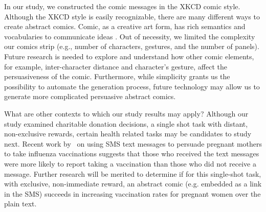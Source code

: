 \begin{description}[leftmargin=\parindent,topsep=0pt,partopsep=3pt,parsep=0pt,itemsep=3pt, listparindent=\parindent]
  \item[Comic Message Construction:] In our study, we constructed the comic messages in the XKCD comic style. Although the XKCD style is easily recognizable, there are many different ways to create abstract comics.  Comic, as a creative art form, has rich semantics and vocabularies to communicate ideas \cite{scott1993understanding}. Out of necessity, we limited the complexity our comics strip (e.g., number of characters, gestures, and the number of panels). Future research is needed to explore and understand how other comic elements, for example, inter-character distance and character's gesture, affect the persuasiveness of the comic. Furthermore, while simplicity grants us the possibility to automate the generation process, future technology may allow us to generate more complicated persuasive abstract comics.
  
    \item[Other Experimental Contexts:] What are other contexts to which our study results may apply? Although our study examined charitable donation decisions, a single shot task with distant, non-exclusive rewards, certain health related tasks may be candidates to study next. Recent work by~\textcite{Bushar2017} on using SMS text messages to persuade pregnant mothers to take influenza vaccinations suggests that those who received the text messages were more likely to report taking a vaccination than those who did not receive a message. Further research will be merited to determine if for this single-shot task, with exclusive, non-immediate reward, an abstract comic (e.g. embedded as a link in the SMS) succeeds in increasing vaccination rates for pregnant women over the plain text.
  
\end{description}


